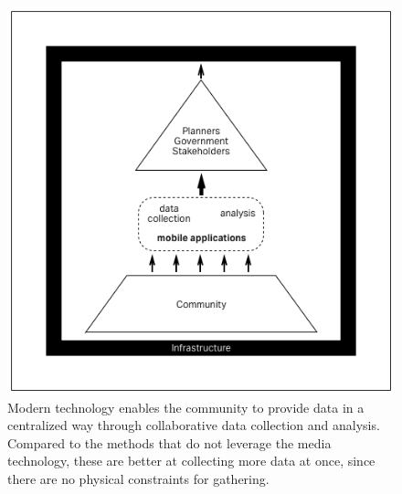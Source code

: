 \begin{figure}[!htb]
  \includegraphics[width=\textwidth]{chapters/2/fig/unstructured_app.png}               
  \caption[diagram: unstructured app]{
    Modern technology enables the community to provide data in a centralized way through collaborative data collection and analysis. Compared to the methods that do not leverage the media technology, these are better at collecting more data at once, since there are no physical constraints for gathering.}
  \label{fig:unstructured_app}
\end{figure}


